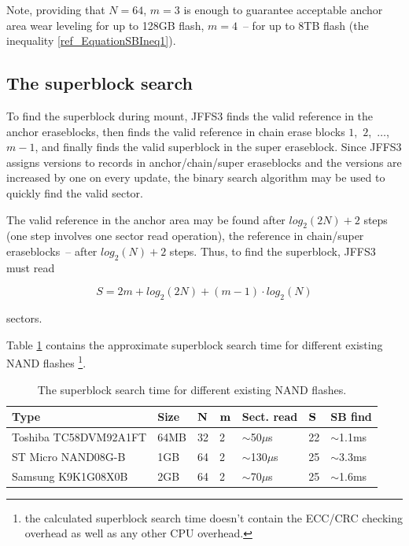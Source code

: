 \documentclass[12pt,a4paper,oneside,titlepage]{article}
\begin{document}
Note, providing that $N=64$, $m=3$ is enough to guarantee acceptable anchor
area wear leveling for up to 128GB flash, $m=4$~-- for up to 8TB flash (the
inequality \ref{ref_EquationSBIneq1}).

%
%
\subsection{The superblock search}

To find the superblock during mount, JFFS3 finds the valid reference in the
anchor eraseblocks, then finds the valid reference in chain erase blocks
$1$,~$2$,~$\ldots$,~$m-1$, and finally finds the valid superblock in the super
eraseblock.  Since JFFS3 assigns versions to records in anchor/chain/super
eraseblocks and the versions are increased by one on every update, the binary
search algorithm may be used to quickly find the valid sector.

The valid reference in the anchor area may be found after $log_2(2N)+2$ steps
(one step involves one sector read operation), the reference in chain/super
eraseblocks~-- after $log_2(N)+2$ steps. Thus, to find the superblock, JFFS3
must read

$$
S = 2m + log_2(2N) + (m - 1) \cdot log_2(N)
$$

sectors.

Table \ref{ref_TableNANDTimes} contains the approximate superblock search time
for different existing NAND flashes
\footnote{the calculated superblock search time doesn't contain the ECC/CRC
checking overhead as well as any other CPU overhead.}.

\begin{table}[h]
\begin{center}
\begin{tabular}{lllllll}
\textbf{Type} & \textbf{Size} & $\bf N$ & $\bf m$ & \textbf{Sect. read} & $\bf
S$ & \textbf{SB find}\\
\hline
Toshiba TC58DVM92A1FT & 64MB & 32 & 2 & $\sim$50$\mu$s  & 22 & $\sim$1.1ms\\
ST Micro NAND08G-B    & 1GB  & 64 & 2 & $\sim$130$\mu$s & 25 & $\sim$3.3ms\\
Samsung K9K1G08X0B    & 2GB  & 64 & 2 & $\sim$70$\mu$s  & 25 & $\sim$1.6ms\\
\end{tabular}
\caption{The superblock search time for different existing NAND flashes.}
\label{ref_TableNANDTimes}
\end{center}
\end{table}
\end{document}
